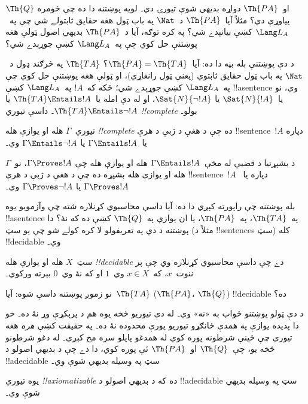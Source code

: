 \documentclass[../../../include/open-logic-section]{subfiles}
\begin{document}
$\Th{Q}$ او~$\Th{PA}$ دواړه بديهي شوې تيورۍ دي۔ لويه پوښتنه دا ده
چې څومره پياوړې دي؟ مثلاً آيا~$\Th{PA}$ د~$\Nat$ په باب ټول هغه
حقايق ثابتولے شي چې په~$\Lang L_A$ کښې بيانېدے شي؟ په کره توګه، آيا
د~$\Th{PA}$ بديهي اصول ټولې هغه پوښتنې حل کوي چې په~$\Lang L_A$ کښې
جوړېدے شي؟

د دې پوښتنې بله بڼه دا ده: آيا~$\Th{PA} = \Th{TA}$؟ $\Th{TA}$ په
څرګند ډول د~$\Nat$ په باب ټول حقايق ثابتوي (يعنې ټول رانغاړي)، او
ټولې هغه پوښتنې حل کوي چې په~$\Lang L_A$ کښې جوړېدے شي؛ ځکه که~$!A$
په~$\Lang L_A$ کښې !!a{sentence} وي، نو يا~$\Sat{N}{!A}$ يا
$\Sat{N}{\lnot !A}$، او له دې امله يا~$\Th{TA} \Entails !A$ يا
$\Th{TA} \Entails \lnot !A$۔ داسې تيوري \emph{!!{complete}} بولو۔

\begin{defn}
تيوري~$\Gamma$ هله او يوازې هله \emph{!!{complete}} ده چې د هغې د
ژبې د هرې !!{sentence}~$!A$ دپاره يا~$\Gamma \Entails !A$ يا
$\Gamma \Entails \lnot !A$ وي۔
\end{defn}

\begin{explain}
د بشپړتيا د قضيې له مخې~$\Gamma \Entails !A$ هله او يوازې هله چې
$\Gamma \Proves !A$، نو~$\Gamma$ هله او يوازې هله بشپړه ده چې د
هغې د ژبې د هرې !!{sentence}~$!A$ دپاره يا~$\Gamma \Proves !A$ يا
$\Gamma \Proves \lnot !A$ وي۔
\end{explain}

بله پوښتنه چې راپورته کېږي دا ده: آيا داسې محاسبوي کړنلاره شته چې
وآزمويو يوه !!a{sentence} په~$\Th{TA}$، په~$\Th{PA}$، يا ان يوازې
په~$\Th{Q}$ کښې ده که نۀ؟ دا پوښتنه د دې په تعريفولو لا کره کولے شو
چې يو سټ (مثلاً د !!{sentence}s سټ) کله !!{decidable} وي۔

\begin{defn}
سټ~$X$ هله او يوازې هله \emph{!!{decidable}} دے چې داسې محاسبوي
کړنلاره وي چې پر ننوت~$x$، که~$x \in X$ وي~$1$ او که نۀ وي~$0$
بېرته ورکوي۔
\end{defn}

نو زموږ پوښتنه داسې شوه: آيا~$\Th{TA}$ ($\Th{PA}$، $\Th{Q}$)
!!{decidable} ده؟

د دې ټولو پوښتنو ځواب به «نه» وي۔ له دې تيوريو څخه يوه هم د پرېکړې
وړ نۀ ده۔ خو دا پديده يوازې په همدې ځانګړو تيوريو پورې محدوده نۀ ده۔
په حقيقت کښې \emph{هره} هغه تيوري چې ځينې شرطونه پوره کوي له همدغو
پايلو سره مخ کېږي۔ له دغو شرطونو څخه يو، چې~$\Th{Q}$ او~$\Th{PA}$
ئې پوره کوي، دا دے چې د بديهي اصولو د !!a{decidable} سټ په وسيله
بديهي شوې وي۔

\begin{defn}
يوه تيوري \emph{!!{axiomatizable}} ده که د بديهي اصولو د
!!a{decidable} سټ په وسيله بديهي شوې وي۔
\end{defn}
\end{document}

